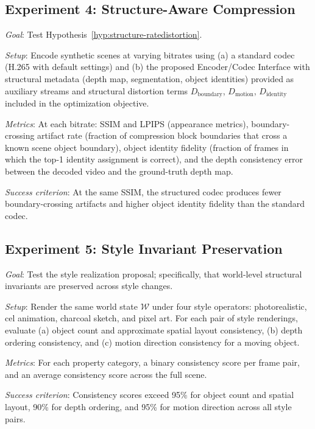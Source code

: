 \documentclass[11pt,a4paper]{article}
\theoremstyle{plain}
\theoremstyle{definition}
\theoremstyle{remark}
\begin{document}
\subsection{Experiment 4: Structure-Aware Compression}

\textit{Goal}: Test Hypothesis~\ref{hyp:structure-ratedistortion}.

\textit{Setup}: Encode synthetic scenes at varying bitrates using (a) a standard codec (H.265 with default settings) and (b) the proposed Encoder/Codec Interface with structural metadata (depth map, segmentation, object identities) provided as auxiliary streams and structural distortion terms $D_{\mathrm{boundary}}$, $D_{\mathrm{motion}}$, $D_{\mathrm{identity}}$ included in the optimization objective.

\textit{Metrics}: At each bitrate: SSIM and LPIPS (appearance metrics), boundary-crossing artifact rate (fraction of compression block boundaries that cross a known scene object boundary), object identity fidelity (fraction of frames in which the top-1 identity assignment is correct), and the depth consistency error between the decoded video and the ground-truth depth map.

\textit{Success criterion}: At the same SSIM, the structured codec produces fewer boundary-crossing artifacts and higher object identity fidelity than the standard codec.

\subsection{Experiment 5: Style Invariant Preservation}

\textit{Goal}: Test the style realization proposal; specifically, that world-level structural invariants are preserved across style changes.

\textit{Setup}: Render the same world state $\mathcal{W}$ under four style operators: photorealistic, cel animation, charcoal sketch, and pixel art. For each pair of style renderings, evaluate (a) object count and approximate spatial layout consistency, (b) depth ordering consistency, and (c) motion direction consistency for a moving object.

\textit{Metrics}: For each property category, a binary consistency score per frame pair, and an average consistency score across the full scene.

\textit{Success criterion}: Consistency scores exceed 95\% for object count and spatial layout, 90\% for depth ordering, and 95\% for motion direction across all style pairs.
\end{document}
